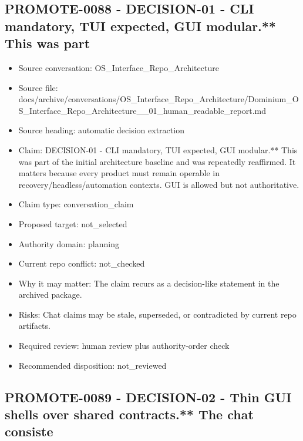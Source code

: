 \documentclass[11pt,a4paper]{report}
\begin{document}
\subsection{PROMOTE-0088 - DECISION-01 - CLI mandatory, TUI expected, GUI modular.** This was part}

\begin{itemize}
\item Source conversation: OS\_Interface\_Repo\_Architecture
\item Source file: docs/archive/conversations/OS\_Interface\_Repo\_Architecture/Dominium\_OS\_Interface\_Repo\_Architecture\_\_01\_human\_readable\_report.md
\item Source heading: automatic decision extraction
\item Claim: DECISION-01 - CLI mandatory, TUI expected, GUI modular.** This was part of the initial architecture baseline and was repeatedly reaffirmed. It matters because every product must remain operable in recovery/headless/automation contexts. GUI is allowed but not authoritative.
\item Claim type: conversation\_claim
\item Proposed target: not\_selected
\item Authority domain: planning
\item Current repo conflict: not\_checked
\item Why it may matter: The claim recurs as a decision-like statement in the archived package.
\item Risks: Chat claims may be stale, superseded, or contradicted by current repo artifacts.
\item Required review: human review plus authority-order check
\item Recommended disposition: not\_reviewed
\end{itemize}

\subsection{PROMOTE-0089 - DECISION-02 - Thin GUI shells over shared contracts.** The chat consiste}
\end{document}
